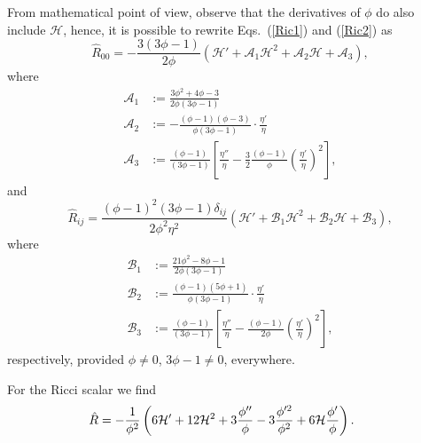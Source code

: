 \documentclass[aps,superscriptaddress, showpacs,preprintnumbers, superscriptaddress, nofootinbibt,twocolumn]{revtex4-2}
\begin{document}
From mathematical point of view, observe that the derivatives of $\phi$ do also include $\mathcal H$, hence, it is possible to rewrite  Eqs.~(\ref{Ric1}) and (\ref{Ric2}) as
 \begin{equation}
    \hat{R}_{00}=-\frac{3(3\phi-1)}{2\phi}\left( \mathcal{H}'+\mathcal{A}_1\mathcal{H}^2
      +\mathcal{A}_2\mathcal{H}+\mathcal{A}_3
      \right),
    \end{equation}
    where
\begin{equation}
      \begin{split}
        \mathcal{A}_1&:= \frac{3\phi^2+4\phi-3}{2\phi(3\phi-1)}\\
        \mathcal{A}_2&:=-\frac{(\phi-1)(\phi-3)}{\phi(3\phi-1)}\cdot\frac{\eta'}{\eta} \\
        \mathcal{A}_3&:=\frac{(\phi-1)}{(3\phi-1)}\left[\frac{\eta''}{\eta}
          -\frac{3}{2}\frac{(\phi-1)}{\phi} \left(\frac{\eta'}{\eta} \right)^2
          \right],
        \end{split}
      \end{equation}
      and
\begin{equation}
        \hat{R}_{ij}=\frac{(\phi-1)^2(3\phi-1)\delta_{ij}}{2\phi^2\eta^2}\left( \mathcal{H}'+\mathcal{B}_1\mathcal{H}^2
       +\mathcal{B}_2\mathcal{H}+\mathcal{B}_3  \right),
   \end{equation}
 where
    \begin{equation}
      \begin{split}
        \mathcal{B}_1&:= \frac{21\phi^2-8\phi-1}{2\phi(3\phi-1)}\\
        \mathcal{B}_2&:=\frac{(\phi-1)(5\phi+1)}{\phi(3\phi-1)}\cdot \frac{\eta'}{\eta}
         \\
          \mathcal{B}_3&:=\frac{(\phi-1)}{(3\phi-1)}\left[\frac{\eta''}{\eta}- \frac{(\phi-1)}{2\phi}
            \left(\frac{\eta'}{\eta} \right)^2
          \right],
        \end{split}
      \end{equation}
 respectively, provided $\phi\neq 0$, $3\phi-1\neq 0$, everywhere.

For the Ricci scalar we find
\begin{eqnarray}
\hspace{-0.5cm}\hat{R} =-\frac{1}{\phi ^{2}}\left( 6\mathcal{H}^{\prime }+12\mathcal{H}^{2}+3\frac{\phi ^{\prime
\prime }}{\phi }-3\frac{\phi ^{\prime 2}}{\phi ^{2}}+6\mathcal{H}\frac{\phi ^{\prime }%
}{\phi }\right).
\end{eqnarray}
\end{document}
